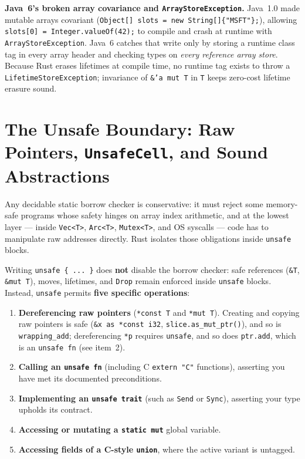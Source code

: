 \begin{connectionbox}
\textbf{Java~6's broken array covariance and \texttt{ArrayStoreException}.} Java~1.0 made mutable arrays covariant (\texttt{Object[] slots = new String[]\{"MSFT"\};}), allowing \texttt{slots[0] = Integer.valueOf(42);} to compile and crash at runtime with \texttt{ArrayStoreException}. Java~6 catches that write only by storing a runtime class tag in every array header and checking types on \emph{every reference array store}. Because Rust erases lifetimes at compile time, no runtime tag exists to throw a \texttt{LifetimeStoreException}; invariance of \texttt{\&'a mut T} in \texttt{T} keeps zero-cost lifetime erasure sound.
\end{connectionbox}

\section{The Unsafe Boundary: Raw Pointers, \texttt{UnsafeCell}, and Sound Abstractions}
\label{ch04:unsafe-boundary}

Any decidable static borrow checker is conservative: it must reject some memory-safe programs whose safety hinges on array index arithmetic, and at the lowest layer --- inside \texttt{Vec<T>}, \texttt{Arc<T>}, \texttt{Mutex<T>}, and OS syscalls --- code has to manipulate raw addresses directly. Rust isolates those obligations inside \texttt{unsafe} blocks.

Writing \texttt{unsafe \{ ... \}} does \textbf{not} disable the borrow checker: safe references (\texttt{\&T}, \texttt{\&mut T}), moves, lifetimes, and \texttt{Drop} remain enforced inside \texttt{unsafe} blocks. Instead, \texttt{unsafe} permits \textbf{five specific operations}:
\begin{enumerate}
  \item \textbf{Dereferencing raw pointers} (\texttt{*const T} and \texttt{*mut T}). Creating and copying raw pointers is safe (\texttt{\&x as *const i32}, \texttt{slice.as\_mut\_ptr()}), and so is \texttt{wrapping\_add}; dereferencing \texttt{*p} requires \texttt{unsafe}, and so does \texttt{ptr.add}, which is an \texttt{unsafe fn} (see item~2).
  \item \textbf{Calling an \texttt{unsafe fn}} (including C \texttt{extern "C"} functions), asserting you have met its documented preconditions.
  \item \textbf{Implementing an \texttt{unsafe trait}} (such as \texttt{Send} or \texttt{Sync}), asserting your type upholds its contract.
  \item \textbf{Accessing or mutating a \texttt{static mut}} global variable.
  \item \textbf{Accessing fields of a C-style \texttt{union}}, where the active variant is untagged.
\end{enumerate}

